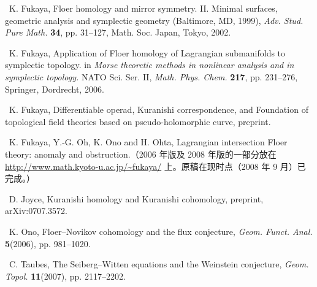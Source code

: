 {\small
\noindent [Fuk1]\ K. Fukaya, Floer homology and mirror symmetry. II. Minimal surfaces, geometric analysis and symplectic geometry (Baltimore, MD, 1999), \textit{Adv. Stud. Pure Math.} \textbf{34}, pp. 31–127, Math. Soc. Japan, Tokyo, 2002.\par\smallskip

\noindent [Fuk2]\ K. Fukaya, Application of Floer homology of Lagrangian submanifolds to symplectic topology. in \textit{Morse theoretic methods in nonlinear analysis and in symplectic topology.} NATO Sci. Ser. II, \textit{Math. Phys. Chem.} \textbf{217}, pp. 231–276, Springer, Dordrecht, 2006.\par\smallskip

\noindent [Fuk3]\ K. Fukaya, Differentiable operad, Kuranishi correspondence, and Foundation of topological field theories based on pseudo-holomorphic curve, preprint.\par\smallskip

\noindent [FOOO]\ K. Fukaya, Y.-G. Oh, K. Ono and H. Ohta, Lagrangian intersection Floer theory: anomaly and obstruction.（2006 年版及 2008 年版的一部分放在 \url{http://www.math.kyoto-u.ac.jp/~fukaya/} 上。原稿在现时点（2008 年 9 月）已完成。）\par\smallskip

\noindent [Joy]\ D. Joyce, Kuranishi homology and Kuranishi cohomology, preprint, arXiv:0707.3572.\par\smallskip

\noindent [Ono]\ K. Ono, Floer–Novikov cohomology and the flux conjecture, \textit{Geom. Funct. Anal.} \textbf{5}(2006), pp. 981–1020.\par\smallskip

\noindent [Tau]\ C. Taubes, The Seiberg–Witten equations and the Weinstein conjecture, \textit{Geom. Topol.} \textbf{11}(2007), pp. 2117–2202.\par\smallskip
}

